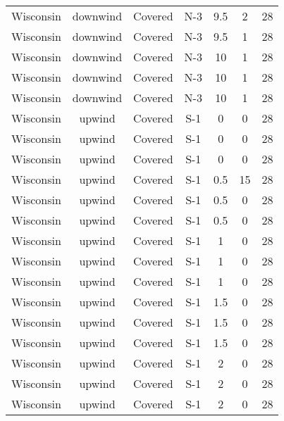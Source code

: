 \documentclass{article}
\begin{document}
\begin{longtable}[c]{ccccccc}
Wisconsin & downwind  & Covered     & N-3             & 9.5          & 2           & 28  \\
Wisconsin & downwind  & Covered     & N-3             & 9.5          & 1           & 28  \\
Wisconsin & downwind  & Covered     & N-3             & 10           & 1           & 28  \\
Wisconsin & downwind  & Covered     & N-3             & 10           & 1           & 28  \\
Wisconsin & downwind  & Covered     & N-3             & 10           & 1           & 28  \\
Wisconsin & upwind    & Covered     & S-1             & 0            & 0           & 28  \\
Wisconsin & upwind    & Covered     & S-1             & 0            & 0           & 28  \\
Wisconsin & upwind    & Covered     & S-1             & 0            & 0           & 28  \\
Wisconsin & upwind    & Covered     & S-1             & 0.5          & 15          & 28  \\
Wisconsin & upwind    & Covered     & S-1             & 0.5          & 0           & 28  \\
Wisconsin & upwind    & Covered     & S-1             & 0.5          & 0           & 28  \\
Wisconsin & upwind    & Covered     & S-1             & 1            & 0           & 28  \\
Wisconsin & upwind    & Covered     & S-1             & 1            & 0           & 28  \\
Wisconsin & upwind    & Covered     & S-1             & 1            & 0           & 28  \\
Wisconsin & upwind    & Covered     & S-1             & 1.5          & 0           & 28  \\
Wisconsin & upwind    & Covered     & S-1             & 1.5          & 0           & 28  \\
Wisconsin & upwind    & Covered     & S-1             & 1.5          & 0           & 28  \\
Wisconsin & upwind    & Covered     & S-1             & 2            & 0           & 28  \\
Wisconsin & upwind    & Covered     & S-1             & 2            & 0           & 28  \\
Wisconsin & upwind    & Covered     & S-1             & 2            & 0           & 28  \\

\end{longtable}
\end{document}
